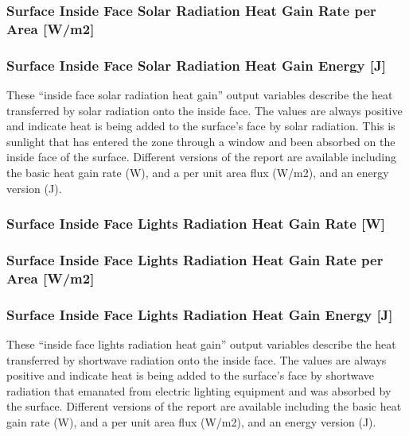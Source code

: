 \subsubsection{Surface Inside Face Solar Radiation Heat Gain Rate per Area {[}W/m2{]}}\label{surface-inside-face-solar-radiation-heat-gain-rate-per-area-wm2}

\subsubsection{Surface Inside Face Solar Radiation Heat Gain Energy {[}J{]}}\label{surface-inside-face-solar-radiation-heat-gain-energy-j}

These ``inside face solar radiation heat gain'' output variables describe the heat transferred by solar radiation onto the inside face. The values are always positive and indicate heat is being added to the surface's face by solar radiation. This is sunlight that has entered the zone through a window and been absorbed on the inside face of the surface. Different versions of the report are available including the basic heat gain rate (W), and a per unit area flux (W/m2), and an energy version (J).

\subsubsection{Surface Inside Face Lights Radiation Heat Gain Rate {[}W{]}}\label{surface-inside-face-lights-radiation-heat-gain-rate-w}

\subsubsection{Surface Inside Face Lights Radiation Heat Gain Rate per Area {[}W/m2{]}}\label{surface-inside-face-lights-radiation-heat-gain-rate-per-area-wm2}

\subsubsection{Surface Inside Face Lights Radiation Heat Gain Energy {[}J{]}}\label{surface-inside-face-lights-radiation-heat-gain-energy-j}

These ``inside face lights radiation heat gain'' output variables describe the heat transferred by shortwave radiation onto the inside face. The values are always positive and indicate heat is being added to the surface's face by shortwave radiation that emanated from electric lighting equipment and was absorbed by the surface. Different versions of the report are available including the basic heat gain rate (W), and a per unit area flux (W/m2), and an energy version (J).

